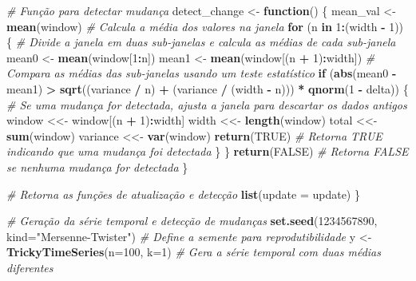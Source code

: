 \documentclass[
]{article}
\newenvironment{Shaded}{\begin{snugshade}}{\end{snugshade}}
\newcommand{\AttributeTok}[1]{\textcolor[rgb]{0.13,0.29,0.53}{#1}}
\newcommand{\CommentTok}[1]{\textcolor[rgb]{0.56,0.35,0.01}{\textit{#1}}}
\newcommand{\ConstantTok}[1]{\textcolor[rgb]{0.56,0.35,0.01}{#1}}
\newcommand{\ControlFlowTok}[1]{\textcolor[rgb]{0.13,0.29,0.53}{\textbf{#1}}}
\newcommand{\DecValTok}[1]{\textcolor[rgb]{0.00,0.00,0.81}{#1}}
\newcommand{\FunctionTok}[1]{\textcolor[rgb]{0.13,0.29,0.53}{\textbf{#1}}}
\newcommand{\NormalTok}[1]{#1}
\newcommand{\OtherTok}[1]{\textcolor[rgb]{0.56,0.35,0.01}{#1}}
\newcommand{\SpecialCharTok}[1]{\textcolor[rgb]{0.81,0.36,0.00}{\textbf{#1}}}
\newcommand{\StringTok}[1]{\textcolor[rgb]{0.31,0.60,0.02}{#1}}
\begin{document}
\begin{Shaded}
\begin{Highlighting}[]
  \CommentTok{\# Função para detectar mudança}
\NormalTok{  detect\_change }\OtherTok{\textless{}{-}} \ControlFlowTok{function}\NormalTok{() \{}
\NormalTok{    mean\_val }\OtherTok{\textless{}{-}} \FunctionTok{mean}\NormalTok{(window) }\CommentTok{\# Calcula a média dos valores na janela}
    \ControlFlowTok{for}\NormalTok{ (n }\ControlFlowTok{in} \DecValTok{1}\SpecialCharTok{:}\NormalTok{(width }\SpecialCharTok{{-}} \DecValTok{1}\NormalTok{)) \{}
      \CommentTok{\# Divide a janela em duas sub{-}janelas e calcula as médias de cada sub{-}janela}
\NormalTok{      mean0 }\OtherTok{\textless{}{-}} \FunctionTok{mean}\NormalTok{(window[}\DecValTok{1}\SpecialCharTok{:}\NormalTok{n])}
\NormalTok{      mean1 }\OtherTok{\textless{}{-}} \FunctionTok{mean}\NormalTok{(window[(n }\SpecialCharTok{+} \DecValTok{1}\NormalTok{)}\SpecialCharTok{:}\NormalTok{width])}
      \CommentTok{\# Compara as médias das sub{-}janelas usando um teste estatístico}
      \ControlFlowTok{if}\NormalTok{ (}\FunctionTok{abs}\NormalTok{(mean0 }\SpecialCharTok{{-}}\NormalTok{ mean1) }\SpecialCharTok{\textgreater{}} \FunctionTok{sqrt}\NormalTok{((variance }\SpecialCharTok{/}\NormalTok{ n) }\SpecialCharTok{+}\NormalTok{ (variance }\SpecialCharTok{/}\NormalTok{ (width }\SpecialCharTok{{-}}\NormalTok{ n))) }\SpecialCharTok{*} \FunctionTok{qnorm}\NormalTok{(}\DecValTok{1} \SpecialCharTok{{-}}\NormalTok{ delta)) \{}
        \CommentTok{\# Se uma mudança for detectada, ajusta a janela para descartar os dados antigos}
\NormalTok{        window }\OtherTok{\textless{}\textless{}{-}}\NormalTok{ window[(n }\SpecialCharTok{+} \DecValTok{1}\NormalTok{)}\SpecialCharTok{:}\NormalTok{width]}
\NormalTok{        width }\OtherTok{\textless{}\textless{}{-}} \FunctionTok{length}\NormalTok{(window)}
\NormalTok{        total }\OtherTok{\textless{}\textless{}{-}} \FunctionTok{sum}\NormalTok{(window)}
\NormalTok{        variance }\OtherTok{\textless{}\textless{}{-}} \FunctionTok{var}\NormalTok{(window)}
        \FunctionTok{return}\NormalTok{(}\ConstantTok{TRUE}\NormalTok{) }\CommentTok{\# Retorna TRUE indicando que uma mudança foi detectada}
\NormalTok{      \}}
\NormalTok{    \}}
    \FunctionTok{return}\NormalTok{(}\ConstantTok{FALSE}\NormalTok{) }\CommentTok{\# Retorna FALSE se nenhuma mudança for detectada}
\NormalTok{  \}}
  
  \CommentTok{\# Retorna as funções de atualização e detecção}
  \FunctionTok{list}\NormalTok{(}\AttributeTok{update =}\NormalTok{ update)}
\NormalTok{\}}

\CommentTok{\# Geração da série temporal e detecção de mudanças}
\FunctionTok{set.seed}\NormalTok{(}\DecValTok{1234567890}\NormalTok{, }\AttributeTok{kind=}\StringTok{"Mersenne{-}Twister"}\NormalTok{) }\CommentTok{\# Define a semente para reprodutibilidade}
\NormalTok{y }\OtherTok{\textless{}{-}} \FunctionTok{TrickyTimeSeries}\NormalTok{(}\AttributeTok{n=}\DecValTok{100}\NormalTok{, }\AttributeTok{k=}\DecValTok{1}\NormalTok{) }\CommentTok{\# Gera a série temporal com duas médias diferentes}


\end{Highlighting}
\end{Shaded}
\end{document}

